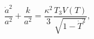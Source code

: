 \begin{equation}\label{Eeq1}
\frac{\dot a^2}{a^2}+\frac{k}{a^2} = \frac{\kappa^2}{3} 
\frac{T_{3}V(T)}{\sqrt{1-\dot{T}^{2}}},
\end{equation}

